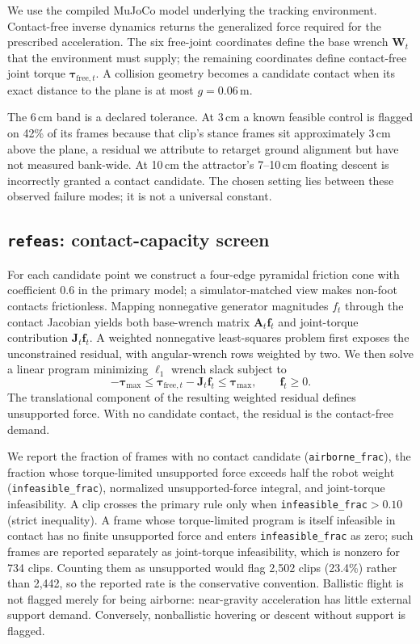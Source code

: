 \documentclass[letterpaper,10pt,conference]{ieeeconf}
\begin{document}
We use the compiled MuJoCo model underlying the tracking environment. Contact-free inverse
dynamics returns the generalized force required for the prescribed acceleration. The six
free-joint coordinates define the base wrench $\mathbf W_t$ that the environment must supply; the
remaining coordinates define contact-free joint torque $\boldsymbol\tau_{\mathrm{free},t}$. A collision
geometry becomes a candidate contact when its exact distance to the plane is at most
$g=0.06$\,m.

The 6\,cm band is a declared tolerance. At 3\,cm a known feasible control is flagged on 42\% of
its frames because that clip's stance frames sit approximately 3\,cm above the plane, a residual
we attribute to retarget ground alignment but have not measured bank-wide. At 10\,cm the
attractor's 7--10\,cm floating descent is incorrectly granted a contact candidate. The chosen
setting lies between these observed failure modes; it is not a universal constant.

\subsection{\texttt{refeas}: contact-capacity screen}

For each candidate point we construct a four-edge pyramidal friction cone with coefficient 0.6 in
the primary model; a simulator-matched view makes non-foot contacts frictionless. Mapping
nonnegative generator magnitudes $f_t$ through the contact Jacobian yields both base-wrench
matrix $\mathbf A_t\mathbf f_t$ and joint-torque contribution $\mathbf J_t\mathbf f_t$. A weighted nonnegative least-squares
problem first exposes the unconstrained residual, with angular-wrench rows weighted by two. We
then solve a linear program minimizing $\ell_1$ wrench slack subject to
\begin{equation}
-\boldsymbol\tau_{\max} \leq \boldsymbol\tau_{\mathrm{free},t}-\mathbf J_t\mathbf f_t \leq \boldsymbol\tau_{\max},
\qquad \mathbf f_t\geq0.
\label{eq:contact}
\end{equation}
The translational component of the resulting weighted residual defines unsupported force. With
no candidate contact, the residual is the contact-free demand.

We report the fraction of frames with no contact candidate (\texttt{airborne\_frac}), the fraction
whose torque-limited unsupported force exceeds half the robot weight
(\texttt{infeasible\_frac}), normalized unsupported-force integral, and joint-torque
infeasibility. A clip crosses the primary rule only when
\texttt{infeasible\_frac}$>0.10$ (strict inequality). A frame whose torque-limited program is
itself infeasible in contact has no finite unsupported force and enters
\texttt{infeasible\_frac} as zero; such frames are reported separately as joint-torque
infeasibility, which is nonzero for 734 clips. Counting them as unsupported would flag 2,502
clips (23.4\%) rather than 2,442, so the reported rate is the conservative convention.
Ballistic flight is not flagged merely for
being airborne: near-gravity acceleration has little external support demand. Conversely,
nonballistic hovering or descent without support is flagged.
\end{document}
